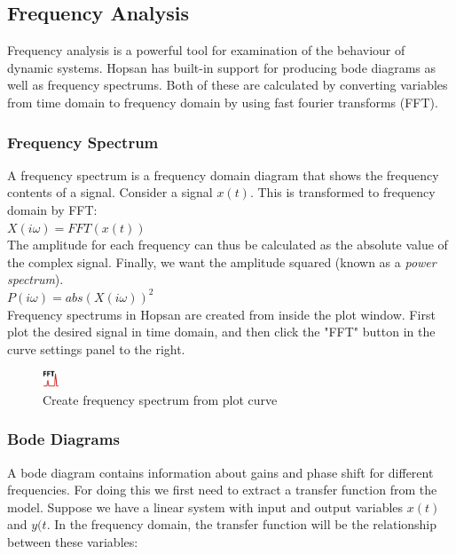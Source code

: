 
\subsection{Frequency Analysis}
Frequency analysis is a powerful tool for examination of the behaviour of dynamic systems. Hopsan has built-in support for producing bode diagrams as well as frequency spectrums. Both of these are calculated by converting variables from time domain to frequency domain by using fast fourier transforms (FFT).

\subsubsection{Frequency Spectrum}
A frequency spectrum is a frequency domain diagram that shows the frequency contents of a signal. Consider a signal $x(t)$. This is transformed to frequency domain by FFT:\\

$X(i\omega)=FFT(x(t))$\\

The amplitude for each frequency can thus be calculated as the absolute value of the complex signal. Finally, we want the amplitude squared (known as a \textit{power spectrum}).\\

$P(i\omega)=abs(X(i\omega))^2$\\

Frequency spectrums in Hopsan are created from inside the plot window. First plot the desired signal in time domain, and then click the "FFT" button in the curve settings panel to the right.

\begin{figure}
  \includegraphics[width=5mm]
    {../../HopsanGUI/graphics/uiicons/Hopsan-FrequencyAnalysis.png}%
  \caption*{Create frequency spectrum from plot curve}
\end{figure} 

\subsubsection{Bode Diagrams}
A bode diagram contains information about gains and phase shift for different frequencies. For doing this we first need to extract a transfer function from the model. Suppose we have a linear system with input and output variables $x(t)$ and $y(t$. In the frequency domain, the transfer function will be the relationship between these variables:\\

